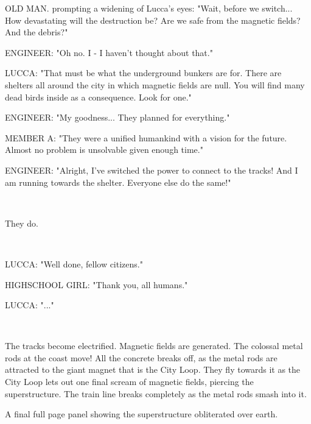 \documentclass[11pt]{article}
\begin{document}
OLD MAN. prompting a widening of Lucca's eyes: "Wait, before we switch...
How devastating will the destruction be? 
Are we safe from the magnetic fields?
And the debris?"

ENGINEER: "Oh no. 
I - I haven't thought about that."

LUCCA: "That must be what the underground bunkers are for.
There are shelters all around the city in which magnetic fields are null.
You will find many dead birds inside as a consequence. 
Look for one."

ENGINEER: "My goodness... They planned for everything."

MEMBER A: "They were a unified humankind with a vision for the future.
Almost no problem is unsolvable given enough time."

ENGINEER: "Alright, I've switched the power to connect to the tracks!
And I am running towards the shelter. 
Everyone else do the same!"

\ 

They do.

\ 

LUCCA: "Well done, fellow citizens."

HIGHSCHOOL GIRL: "Thank you, all humans."

LUCCA: "..."

\ 

The tracks become electrified. 
Magnetic fields are generated. 
The colossal metal rods at the coast move!
All the concrete breaks off, as the metal rods are attracted to the giant magnet that is the City Loop. 
They fly towards it as the City Loop lets out one final scream of magnetic fields, piercing the superstructure.
The train line breaks completely as the metal rods smash into it. 

A final full page panel showing the superstructure obliterated over earth.
\end{document}
